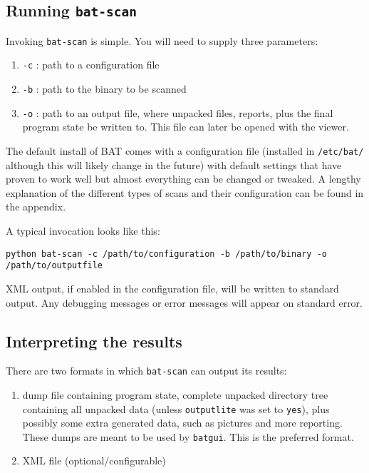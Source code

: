 \documentclass[10pt]{article}
\begin{document}
\subsection{Running \texttt{bat-scan}}

Invoking \texttt{bat-scan} is simple. You will need to supply three
parameters:

\begin{enumerate}
\item \texttt{-c} : path to a configuration file
\item \texttt{-b} : path to the binary to be scanned
\item \texttt{-o} : path to an output file, where unpacked files, reports,
plus the final program state be written to. This file can later be opened with
the viewer.
\end{enumerate}

The default install of BAT comes with a configuration file (installed in
\texttt{/etc/bat/} although this will likely change in the future) with default
settings that have proven to work well but almost everything can be changed or
tweaked. A lengthy explanation of the different types of scans and their
configuration can be found in the appendix.

A typical invocation looks like this:

\texttt{python bat-scan -c /path/to/configuration -b /path/to/binary -o
/path/to/outputfile}

XML output, if enabled in the configuration file, will be written to standard
output. Any debugging messages or error messages will appear on standard error.

\subsection{Interpreting the results}

There are two formats in which \texttt{bat-scan} can output its results:

\begin{enumerate}
\item dump file containing program state, complete unpacked directory tree
containing all unpacked data (unless \texttt{outputlite} was set to
\texttt{yes}), plus possibly some extra generated data, such as pictures and
more reporting. These dumps are meant to be used by \texttt{batgui}. This is
the preferred format.
\item XML file (optional/configurable)
\end{enumerate}
\end{document}
